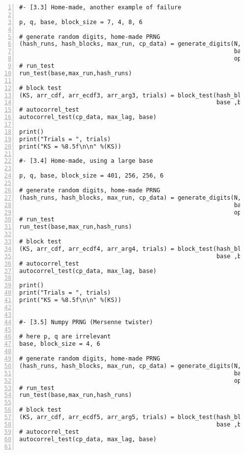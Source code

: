 \documentclass[oneside,10pt]{book}
\begin{document}
\begin{lstlisting}[numbers=left]
#- [3.3] Home-made, another example of failure

p, q, base, block_size = 7, 4, 8, 6  

# generate random digits, home-made PRNG
(hash_runs, hash_blocks, max_run, cp_data) = generate_digits(N, x0, p, q, tau, step,  
                                                             base, block_size, max_lag, 
                                                             option="Home-Made")
# run_test
run_test(base,max_run,hash_runs)

# block test
(KS, arr_cdf, arr_ecdf3, arr_arg3, trials) = block_test(hash_blocks, n_nodes, 
                                                        base ,block_size)
# autocorrel_test 
autocorrel_test(cp_data, max_lag, base) 

print()
print("Trials = ", trials)
print("KS = %8.5f\n\n" %(KS))

#- [3.4] Home-made, using a large base

p, q, base, block_size = 401, 256, 256, 6  

# generate random digits, home-made PRNG
(hash_runs, hash_blocks, max_run, cp_data) = generate_digits(N, x0, p, q, tau, step,  
                                                             base, block_size, max_lag, 
                                                             option="Home-Made")
# run_test
run_test(base,max_run,hash_runs)

# block test
(KS, arr_cdf, arr_ecdf4, arr_arg4, trials) = block_test(hash_blocks, n_nodes, 
                                                        base ,block_size)
# autocorrel_test 
autocorrel_test(cp_data, max_lag, base) 

print()
print("Trials = ", trials)
print("KS = %8.5f\n\n" %(KS))


#- [3.5] Numpy PRNG (Mersenne twister)

# here p, q are irrelevant
base, block_size = 4, 6 

# generate random digits, home-made PRNG
(hash_runs, hash_blocks, max_run, cp_data) = generate_digits(N, x0, p, q, tau, step,  
                                                             base, block_size, max_lag, 
                                                             option="Numpy")
# run_test
run_test(base,max_run,hash_runs)

# block test
(KS, arr_cdf, arr_ecdf5, arr_arg5, trials) = block_test(hash_blocks, n_nodes, 
                                                        base ,block_size)
# autocorrel_test 
autocorrel_test(cp_data, max_lag, base) 


\end{lstlisting}
\end{document}
